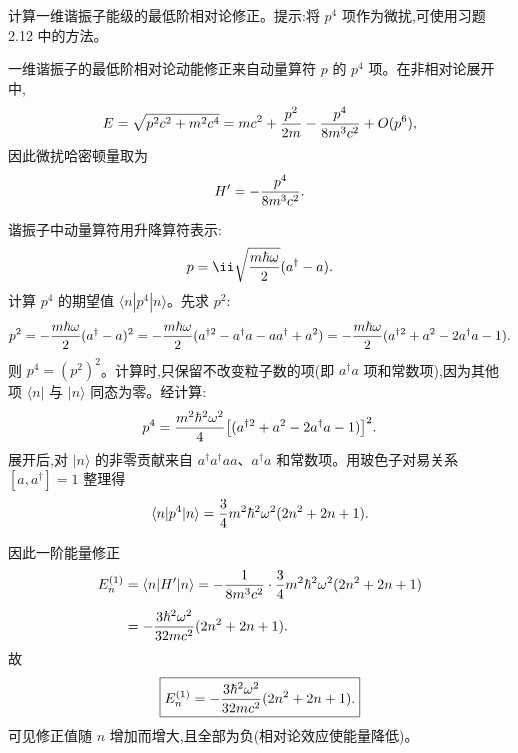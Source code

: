 \begin{question}
计算一维谐振子能级的最低阶相对论修正。提示:将 $p^4$ 项作为微扰,可使用习题 2.12 中的方法。
\end{question}
\begin{solution}
一维谐振子的最低阶相对论动能修正来自动量算符 $p$ 的 $p^4$ 项。在非相对论展开中,
\[
E=\sqrt{p^2c^2+m^2c^4}=mc^2+{p^2\over2m}-{p^4\over8m^3c^2}+O(p^6),
\]
因此微扰哈密顿量取为
\[
H'=-{p^4\over8m^3c^2}.
\]

谐振子中动量算符用升降算符表示:
\[
p=\ii\sqrt{m\hbar\omega\over2}(a^\dagger-a).
\]
计算 $p^4$ 的期望值 $\langle n|p^4|n\rangle$。先求 $p^2$:
\[
p^2=-{m\hbar\omega\over2}(a^\dagger-a)^2
=-{m\hbar\omega\over2}(a^{\dagger2}-a^\dagger a-a a^\dagger+a^2)
=-{m\hbar\omega\over2}(a^{\dagger2}+a^2-2a^\dagger a-1).
\]
则 $p^4=(p^2)^2$。计算时,只保留不改变粒子数的项(即 $a^\dagger a$ 项和常数项),因为其他项 $\langle n|$ 与 $|n\rangle$ 同态为零。经计算:
\[
p^4={m^2\hbar^2\omega^2\over4}\bigl[(a^{\dagger2}+a^2-2a^\dagger a-1)\bigr]^2.
\]
展开后,对 $|n\rangle$ 的非零贡献来自 $a^\dagger a^\dagger a a$、$a^\dagger a$ 和常数项。用玻色子对易关系 $[a,a^\dagger]=1$ 整理得
\[
\langle n|p^4|n\rangle={3\over4}m^2\hbar^2\omega^2(2n^2+2n+1).
\]

因此一阶能量修正
\[
\begin{aligned}
E_n^{(1)}&=\langle n|H'|n\rangle
=-{1\over8m^3c^2}\cdot{3\over4}m^2\hbar^2\omega^2(2n^2+2n+1)\\[4pt]
&=-{3\hbar^2\omega^2\over32mc^2}(2n^2+2n+1).
\end{aligned}
\]
故
\[
\boxed{E_n^{(1)}=-{3\hbar^2\omega^2\over32mc^2}(2n^2+2n+1).}
\]
可见修正值随 $n$ 增加而增大,且全部为负(相对论效应使能量降低)。
\end{solution}

